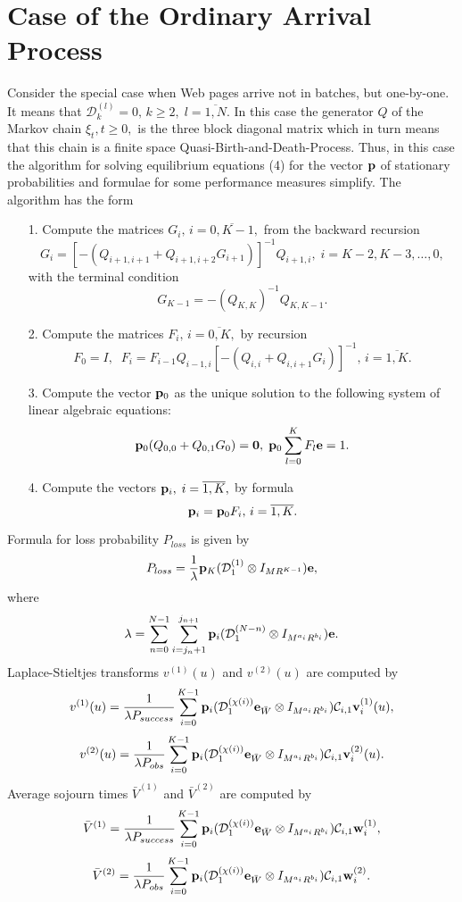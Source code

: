 \documentclass[11pt]{article}
\begin{document}
\section{Case of the Ordinary Arrival Process}
Consider the special case when Web pages arrive not in batches, but
one-by-one. It means that ${\mathcal D}_k^{(l)}=0,\,k\geq
2,\;l=\overline{1,N}.$ In this case  the generator $Q$ of the Markov
chain $\xi_t, t\geq 0,$ is the three block diagonal matrix which in turn
means that this chain is a finite space
Quasi-Birth-and-Death-Process. Thus, in this case the algorithm for
solving equilibrium equations (4) for the vector ${\bf p}$ of
stationary probabilities and formulae for some performance measures
simplify. The algorithm has the form
\begin{itemize}
\item[1.] Compute the matrices $G_i,\,i=\overline{0,K-1},$ from the
backward recursion
$$G_i=[-(Q_{i+1,i+1}+Q_{i+1,i+2}G_{i+1})]^{-1}Q_{i+1,i},\;i=K-2,K-3,\dots,0,$$
with the terminal condition
$$G_{K-1}=-(Q_{K,K})^{-1}Q_{K,K-1}.$$
\item[2.] Compute the matrices $F_i,\,i=\overline{0,K},$ by recursion
$$F_0=I,\;\;F_i=F_{i-1}Q_{i-1,i}[-(Q_{i,i}+Q_{i,i+1}G_i)]^{-1},\,i=\overline{1,K}.$$
\item[3.] Compute the vector ${\bf p}_0$ as the unique solution to the following system
of linear algebraic equations:
$${\bf p}_0(Q_{0,0}+Q_{0,1}G_0)={\bf 0},\;{\bf p}_0\sum\limits_{l=0}^K F_l {\bf e}=1.$$
\item[4.] Compute the vectors ${\bf p}_i,\; i=\overline{1,K},$ by
formula
$${\bf p}_i={\bf p}_0 F_i,\,i=\overline{1,K}. $$
\end{itemize}
Formula for loss probability $P_{loss}$ is given by
$$
P_{loss}=\frac{1}{\lambda} {\bf p}_K ({\mathcal D}^{(1)}_1 \otimes
I_{M R^{K-1}}){\bf e},
$$
where
$$
\lambda=\sum\limits_{n=0}^{N-1}
\sum\limits_{i=j_{n}+1}^{j_{n+1}}{\bf p}_i ({\mathcal D}^{(N-n)}_1
\otimes I_{M^{a_i}R^{b_i}}){\bf e}.
$$
Laplace-Stieltjes transforms $ v^{(1)}(u)$ and $v^{(2)}(u) $ are
computed by
$$v^{(1)}(u)= \frac{1}{\lambda P_{success}}\sum\limits_{i=0}^{K-1} {\bf
 p}_{i}({\mathcal D}^{(\chi(i))}_1{\bf e}_{\bar W}  \otimes
I_{M^{a_i}R^{b_i}}){\mathcal C}_{i,1}
 {\bf v}^{(1)}_{i}(u),
$$
$$
 v^{(2)}(u)= \frac{1}{\lambda P_{obs}}\sum\limits_{i=0}^{K-1} {\bf p}_{i}
 ({\mathcal D}^{(\chi(i))}_1{\bf e}_{\bar W}  \otimes
I_{M^{a_i}R^{b_i}}){\mathcal C}_{i,1}
 {\bf v}^{(2)}_{i}(u).
$$
Average sojourn times   $\bar V^{(1)} $ and $\bar V^{(2)} $ are
computed by
$$\bar V^{(1)}=  \frac{1}{ \lambda P_{success}}\sum\limits_{i=0}^{K-1} {\bf
 p}_{i}({\mathcal D}^{(\chi(i))}_1{\bf e}_{\bar W}  \otimes
I_{M^{a_i}R^{b_i}}){\mathcal C}_{i,1}
 {\bf w}^{(1)}_{i},
$$
$$
 \bar V^{(2)} =  \frac{1}{ \lambda P_{obs}}\sum\limits_{i=0}^{K-1} {\bf p}_{i}
 ({\mathcal D}^{(\chi(i))}_1{\bf e}_{\bar W}  \otimes
I_{M^{a_i}R^{b_i}}){\mathcal C}_{i,1} {\bf w}^{(2)}_{i}.
$$
\end{document}
